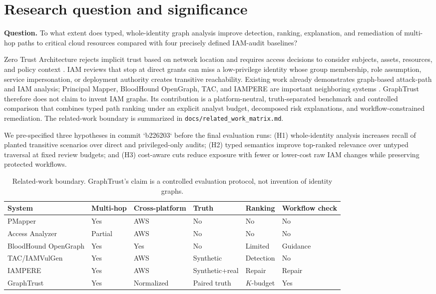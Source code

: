 \documentclass[10pt]{article}
\begin{document}
\section{Research question and significance}

\textbf{Question.} To what extent does typed, whole-identity graph analysis improve detection, ranking, explanation, and remediation of multi-hop paths to critical cloud resources compared with four precisely defined IAM-audit baselines?

Zero Trust Architecture rejects implicit trust based on network location and requires access decisions to consider subjects, assets, resources, and policy context \citep{nist2020,nist2023}. IAM reviews that stop at direct grants can miss a low-privilege identity whose group membership, role assumption, service impersonation, or deployment authority creates transitive reachability. Existing work already demonstrates graph-based attack-path and IAM analysis; Principal Mapper, BloodHound OpenGraph, TAC, and IAMPERE are important neighboring systems \citep{pmapper,bloodhound,tac,iampere}. GraphTrust therefore does not claim to invent IAM graphs. Its contribution is a platform-neutral, truth-separated benchmark and controlled comparison that combines typed path ranking under an explicit analyst budget, decomposed risk explanations, and workflow-constrained remediation. The related-work boundary is summarized in \texttt{docs/related\_work\_matrix.md}.

We pre-specified three hypotheses in commit `b226203` before the final evaluation runs: (H1) whole-identity analysis increases recall of planted transitive scenarios over direct and privileged-only audits; (H2) typed semantics improve top-ranked relevance over untyped traversal at fixed review budgets; and (H3) cost-aware cuts reduce exposure with fewer or lower-cost raw IAM changes while preserving protected workflows.

\begin{table}[H]
\centering
\caption{Related-work boundary. GraphTrust's claim is a controlled evaluation protocol, not invention of identity graphs.}
\small
\begin{tabularx}{\linewidth}{lXXXXX}
\toprule
System & Multi-hop & Cross-platform & Truth & Ranking & Workflow check\\
\midrule
PMapper & Yes & AWS & No & No & No\\
Access Analyzer & Partial & AWS & No & No & No\\
BloodHound OpenGraph & Yes & Yes & No & Limited & Guidance\\
TAC/IAMVulGen & Yes & AWS & Synthetic & Detection & No\\
IAMPERE & Yes & AWS & Synthetic+real & Repair & Repair\\
GraphTrust & Yes & Normalized & Paired truth & $K$-budget & Yes\\
\bottomrule
\end{tabularx}
\end{table}
\end{document}
